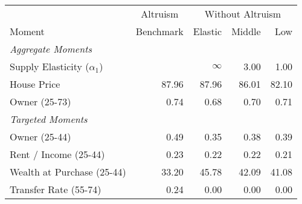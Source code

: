 \begin{tabular}{lrrrr}
 \toprule & \multicolumn{1}{c}{Altruism} & \multicolumn{3}{c}{Without Altruism}  \\  \cmidrule(lr){2-2} \cmidrule(lr){3-5} 

Moment & Benchmark & Elastic & Middle & Low\\
\midrule
\textit{Aggregate Moments} &  &  &  & \\
\;Supply Elasticity ($\alpha_1$) &  & $ \infty $ & 3.00 & 1.00\\
\;House Price & 87.96 & 87.96 & 86.01 & 82.10\\
\;Owner (25-73) & 0.74 & 0.68 & 0.70 & 0.71\\
\textit{Targeted Moments} &  &  &  & \\
\;Owner (25-44) & 0.49 & 0.35 & 0.38 & 0.39\\
\;Rent / Income (25-44) & 0.23 & 0.22 & 0.22 & 0.21\\
\;Wealth at Purchase (25-44) & 33.20 & 45.78 & 42.09 & 41.08\\
\;Transfer Rate (55-74) & 0.24 & 0.00 & 0.00 & 0.00\\
\bottomrule
\end{tabular}
